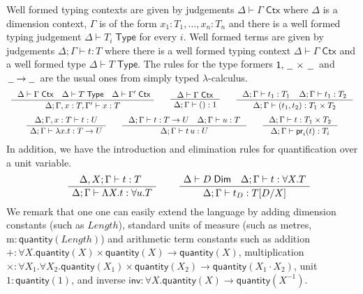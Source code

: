\documentclass[a4paper,UKenglish]{lipics}
\newcommand{\ra}{\rightarrow}
\newcommand{\msf}[1]{\mathsf{#1}} %
\newcommand{\blank}{\, \underline{\hspace{2mm}} \,}
\newcommand{\qnt}{\msf{quantity}}
\newcommand{\length}{\mathit{Length}}
\newcommand{\cj}[2]{#1 \vdash #2 \; \msf{ Ctx}}
\newcommand{\Tj}[2]{#1 \vdash #2 \; \msf{ Type}}
\newcommand{\Dj}[2]{#1 \vdash #2 \; \msf{ Dim}}
\newcommand{\tj}[4]{#1;#2 \vdash #3 : #4}
\newcommand{\proj}{\mathsf{pr}}
\newcommand{\pack}[2]{\mathsf{pack}(#1,#2)}
\newcommand{\unpack}[4]{\mathsf{unpack}\,#1\,\mathsf{as}\,(#2,#3)\,\mathsf{in}\,#4}
\newcommand{\Dim}{D}
\newcommand{\Dvar}{X}
\begin{document}
Well formed typing contexts are given by judgements
$\cj\Delta\Gamma $ where $\Delta$ is a dimension context, $\Gamma$ is
of the form ${x_1 : T_1, \ldots, x_n:T_n}$ and there is a well formed
typing judgement $\Tj\Delta{ T_i}$ for every $i$. Well formed terms
are given by judgements $\tj \Delta \Gamma t T$ where there is a
well formed typing context $\cj \Delta \Gamma$ and
a well formed type $\Tj \Delta T $. The rules for
the type formers $\msf{1}, \blank\times\blank$ and $\blank \! \ra \! \blank$ are the usual ones from
simply typed $\lambda$-calculus.
\[\begin{array}{c}
\AxiomC{
$\cj \Delta\Gamma\quad
\Tj\Delta T\quad
\cj\Delta {\Gamma'}$}
\UnaryInfC
{$\tj \Delta{\Gamma,x:T,\Gamma'}xT$}
\DisplayProof
\qquad
\AxiomC{
$\cj\Delta {\Gamma}
$
}
\UnaryInfC
{$\tj \Delta{\Gamma}{()}1$}
\DisplayProof
\qquad
\AxiomC{
$
\tj\Delta {\Gamma} {t_1}{T_1} \; \; \; \;
\tj\Delta {\Gamma} {t_1}{T_2}
$
}
\UnaryInfC
{$\tj \Delta{\Gamma}{(t_1,t_2)}{T_1\times T_2}$}
\DisplayProof
\\[5mm]
\AxiomC{
$
\tj\Delta {\Gamma,x:T} {t}{U}
$
}
\UnaryInfC
{$\tj\Delta {\Gamma} {\lambda x.t}{T\to U}$}
\DisplayProof
\qquad
\AxiomC{
$
\tj\Delta {\Gamma} {t}{T\to U}\quad
\tj\Delta {\Gamma} {u}{T}
$
}
\UnaryInfC
{$\tj \Delta{\Gamma}{t\,u}U$}
\DisplayProof
\qquad
\AxiomC{
$
\tj\Delta {\Gamma} {t}{T_1\times T_2}
$
}
\UnaryInfC
{$\tj\Delta {\Gamma} {\proj_i(t)}{T_i}$}
\DisplayProof
\end{array}\]
In addition, we have the introduction and elimination rules for quantification over a unit variable.
\[\begin{array}{cc}
\hspace{5mm}
\AxiomC{$\tj{\Delta,\Dvar}\Gamma tT$ }
		\UnaryInfC{$\tj \Delta  \Gamma {\Lambda \Dvar.t} {\forall u.T}$}
		\DisplayProof

&\hspace{5mm}
\AxiomC{$\Dj\Delta \Dim \quad \tj \Delta \Gamma  t{\forall \Dvar.T}$}
	\UnaryInfC{$\tj \Delta  \Gamma {t_\Dim}{T[\Dim/\Dvar]}$}
	\DisplayProof
%
\end{array}\]
We remark that one
one can easily extend the language by adding
dimension constants (such as $\length$),
standard units of measure (such as metres, $\mathrm{m}:\qnt(\length)$)
and
arithmetic term constants
such as addition
$+:\forall \Dvar. \qnt(\Dvar)\times  \qnt(\Dvar) \rightarrow \qnt(\Dvar)$,
multiplication $\times :\forall \Dvar_1. \forall \Dvar_2. \qnt(\Dvar_1)\times \qnt(\Dvar_2) \rightarrow \qnt(\Dvar_1 \cdot \Dvar_2)$,
unit $1:\qnt(1)$,
and inverse $\mathsf{inv}:\forall \Dvar.\qnt(\Dvar)\to \qnt (\Dvar^{-1})$.
\end{document}
